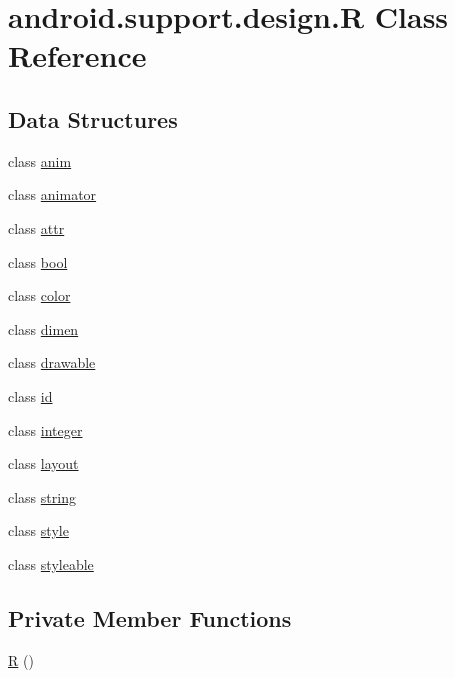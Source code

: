 \hypertarget{classandroid_1_1support_1_1design_1_1_r}{}\section{android.\+support.\+design.\+R Class Reference}
\label{classandroid_1_1support_1_1design_1_1_r}
\subsection*{Data Structures}
\begin{DoxyCompactItemize}
\item 
class \mbox{\hyperlink{classandroid_1_1support_1_1design_1_1_r_1_1anim}{anim}}
\item 
class \mbox{\hyperlink{classandroid_1_1support_1_1design_1_1_r_1_1animator}{animator}}
\item 
class \mbox{\hyperlink{classandroid_1_1support_1_1design_1_1_r_1_1attr}{attr}}
\item 
class \mbox{\hyperlink{classandroid_1_1support_1_1design_1_1_r_1_1bool}{bool}}
\item 
class \mbox{\hyperlink{classandroid_1_1support_1_1design_1_1_r_1_1color}{color}}
\item 
class \mbox{\hyperlink{classandroid_1_1support_1_1design_1_1_r_1_1dimen}{dimen}}
\item 
class \mbox{\hyperlink{classandroid_1_1support_1_1design_1_1_r_1_1drawable}{drawable}}
\item 
class \mbox{\hyperlink{classandroid_1_1support_1_1design_1_1_r_1_1id}{id}}
\item 
class \mbox{\hyperlink{classandroid_1_1support_1_1design_1_1_r_1_1integer}{integer}}
\item 
class \mbox{\hyperlink{classandroid_1_1support_1_1design_1_1_r_1_1layout}{layout}}
\item 
class \mbox{\hyperlink{classandroid_1_1support_1_1design_1_1_r_1_1string}{string}}
\item 
class \mbox{\hyperlink{classandroid_1_1support_1_1design_1_1_r_1_1style}{style}}
\item 
class \mbox{\hyperlink{classandroid_1_1support_1_1design_1_1_r_1_1styleable}{styleable}}
\end{DoxyCompactItemize}
\subsection*{Private Member Functions}
\begin{DoxyCompactItemize}
\item 
\mbox{\hyperlink{classandroid_1_1support_1_1design_1_1_r_ad1e86357443b87d6815db644f01672a1}{R}} ()
\end{DoxyCompactItemize}


